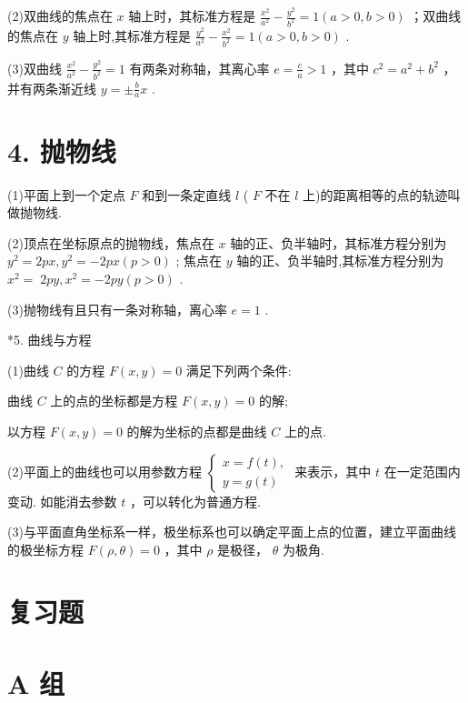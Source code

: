 \documentclass[10pt]{article}
\newcommand*\circled[1]{\tikz[baseline=(char.base)]{\node[shape=circle,draw,inner sep=1.5pt] (char) {\small #1};}}
\begin{document}
(2)双曲线的焦点在 \(x\) 轴上时，其标准方程是 \(\frac{{x}^{2}}{{a}^{2}} - \frac{{y}^{2}}{{b}^{2}} = 1\left( {a > 0,b > 0}\right)\) ；双曲线的焦点在 \(y\) 轴上时,其标准方程是 \(\frac{{y}^{2}}{{a}^{2}} - \frac{{x}^{2}}{{b}^{2}} = 1\left( {a > 0,b > 0}\right)\) .

(3)双曲线 \(\frac{{x}^{2}}{{a}^{2}} - \frac{{y}^{2}}{{b}^{2}} = 1\) 有两条对称轴，其离心率 \(e = \frac{c}{a} > 1\) ，其中 \({c}^{2} = {a}^{2} + {b}^{2}\) ，并有两条渐近线 \(y =  \pm  \frac{b}{a}x\) .

\section*{4. 抛物线}

(1)平面上到一个定点 \(F\) 和到一条定直线 \(l\) ( \(F\) 不在 \(l\) 上)的距离相等的点的轨迹叫做抛物线.

(2)顶点在坐标原点的抛物线，焦点在 \(x\) 轴的正、负半轴时，其标准方程分别为 \({y}^{2} = {2px},{y}^{2} =  - {2px}\left( {p > 0}\right)\) ; 焦点在 \(y\) 轴的正、负半轴时,其标准方程分别为 \({x}^{2} = \; {2py},{x}^{2} =  - {2py}\left( {p > 0}\right)\) .

(3)抛物线有且只有一条对称轴，离心率 \(e = 1\) .

*5. 曲线与方程

(1)曲线 \(C\) 的方程 \(F\left( {x,y}\right)  = 0\) 满足下列两个条件:

 \circled{1}  曲线 \(C\) 上的点的坐标都是方程 \(F\left( {x,y}\right)  = 0\) 的解;

 \circled{2}  以方程 \(F\left( {x,y}\right)  = 0\) 的解为坐标的点都是曲线 \(C\) 上的点.

(2)平面上的曲线也可以用参数方程 \(\left\{  \begin{array}{l} x = f\left( t\right) , \\  y = g\left( t\right)  \end{array}\right.\) 来表示，其中 \(t\) 在一定范围内变动. 如能消去参数 \(t\) ，可以转化为普通方程.

(3)与平面直角坐标系一样，极坐标系也可以确定平面上点的位置，建立平面曲线的极坐标方程 \(F\left( {\rho ,\theta }\right)  = 0\) ，其中 \(\rho\) 是极径， \(\theta\) 为极角.

\section*{复习题}

\section*{A 组}
\end{document}

